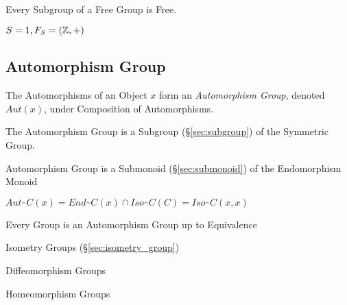 Every Subgroup of a Free Group is Free. \cite{hatcher02}

$S = {1}, F_S = (\mathbb{Z},+)$



\subsection{Automorphism Group}\label{sec:automorphism_group}

The Automorphisms of an Object $x$ form an \emph{Automorphism Group},
denoted $Aut(x)$, under Composition of Automorphisms.

The Automorphism Group is a Subgroup (\S\ref{sec:subgroup}) of the
Symmetric Group.

Automorphism Group is a Submonoid (\S\ref{sec:submonoid})
of the Endomorphism Monoid %

$Aut_\cat{C}(x) = End_\cat{C}(x) \cap Iso_\cat{C}(C) =
Iso_\cat{C}(x,x)$

Every Group is an Automorphism Group up to Equivalence %

Isometry Groups (\S\ref{sec:isometry_group})

Diffeomorphism Groups %

Homeomorphism Groups %

